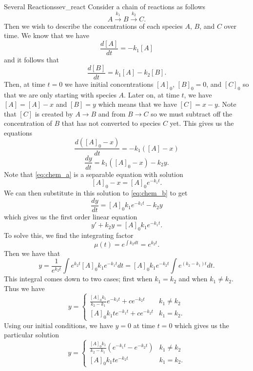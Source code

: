         
        \begin{ex}{Several Reactions}{sev_react}
        Consider a chain of reactions as follows
        \[
        A\xrightarrow{k_1} B \xrightarrow{k_2} C.
        \]
        Then we wish to describe the concentrations of each species $A$, $B$, and $C$ over time. We know that we have
        \[
        \frac{d[A]}{dt}=-k_1[A]
        \]
        and it follows that
        \[
        \frac{d[B]}{dt}=k_1[A]-k_2[B].
        \]
        Then, at time $t=0$ we have initial concentrations $[A]_0$, $[B]_0=0$, and $[C]_0$ so that we are only starting with species $A$. Later on, at time $t$, we have $[A]=[A]-x$ and $[B]=y$ which means that we have $[C]=x-y$.  Note that $[C]$ is created by $A\to B$ and from $B\to C$ so we must subtract off the concentration of $B$ that has not converted to species $C$ yet. This gives us the equations
        \begin{equation}
                        \frac{d([A]_0-x)}{dt}=-k_1([A]-x) \label{eq:chem_a}
        \end{equation}
        \begin{equation}
                        \frac{dy}{dt}=k_1([A]_0-x)-k_2y. \label{eq:chem_b}
        \end{equation}
        Note that \ref{eq:chem_a} is a separable equation with solution
        \[
        [A]_0-x=[A]_0e^{-k_1t}.
        \]
        We can then substitute in this solution to \ref{eq:chem_b} to get
        \[
        \frac{dy}{dt}=[A]_0k_1e^{-k_1t}-k_2y
        \]
        which gives us the first order linear equation
        \[
        y'+k_2y=[A]_0k_1e^{-k_1t}.
        \]
        To solve this, we find the integrating factor
        \[
        \mu(t)=e^{\int k_2 dt}=e^{k_2t}.
        \]
        Then we have that
        \[
        y=\frac{1}{e^{k_2t}}\int e^{k_2t}[A]_0k_1e^{-k_1t}dt=[A]_0k_1e^{-k_2t}\int e^{(k_2-k_1)t}dt.
        \]
        This integral comes down to two cases; first when $k_1=k_2$ and when $k_1\neq k_2$. Thus we have
        \[
        y=\begin{cases}
        \frac{[A]_0k_1}{k_2-k_1}e^{-k_1t}+ce^{-k_2t} & k_1\neq k_2\\
        [A]_0k_1te^{-k_1t}+ce^{-k_2t} & k_1=k_2.
        \end{cases}
        \]
        Using our initial conditions, we have $y=0$ at time $t=0$ which gives us the particular solution
        \[
        y=\begin{cases}
        \frac{[A]_0k_1}{k_2-k_1}\left( e^{-k_1t}-e^{-k_2t}\right) & k_1\neq k_2\\
        [A]_0k_1te^{-k_2t} & k_1=k_2.
        \end{cases}
        \]
        

\end{ex}
